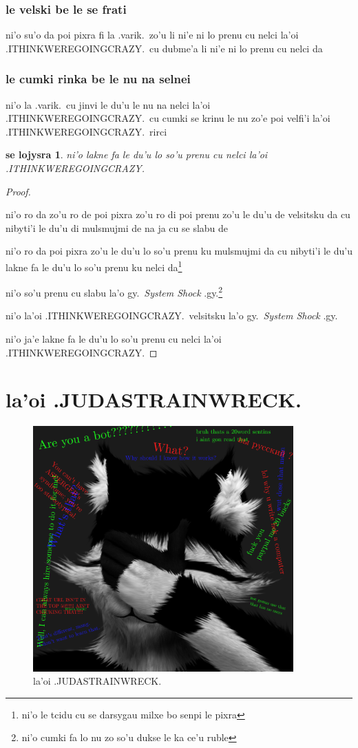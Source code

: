 \documentclass{report}
\newtheorem{thm}{se lojysra}
\begin{document}
\subsection{le velski be le se frati}
ni'o su'o da poi pixra fi la .varik.\ zo'u li ni'e ni lo prenu cu nelci la'oi .ITHINKWEREGOINGCRAZY.\ cu dubme'a li ni'e ni lo prenu cu nelci da

\subsection{le cumki rinka be le nu na selnei}
ni'o la .varik.\ cu jinvi le du'u le nu na nelci la'oi .ITHINKWEREGOINGCRAZY.\ cu cumki se krinu le nu zo'e poi velfi'i la'oi .ITHINKWEREGOINGCRAZY.\ rirci

\begin{thm}
ni'o lakne fa le du'u lo so'u prenu cu nelci la'oi .ITHINKWEREGOINGCRAZY.

\end{thm}

\begin{proof}
${}$

ni'o ro da zo'u ro de poi pixra zo'u ro di poi prenu zo'u le du'u de velsitsku da cu nibyti'i le du'u di mulsmujmi de na ja cu se slabu de

ni'o ro da poi pixra zo'u le du'u lo so'u prenu ku mulsmujmi da cu nibyti'i le du'u lakne fa le du'u lo so'u prenu ku nelci da\footnote{ni'o le tcidu cu se darsygau milxe bo senpi le pixra}

ni'o so'u prenu cu slabu la'o gy.\ \textit{System Shock} .gy.\footnote{ni'o cumki fa lo nu zo so'u dukse le ka ce'u ruble}

ni'o la'oi .ITHINKWEREGOINGCRAZY.\ velsitsku la'o gy.\ \textit{System Shock} .gy.

ni'o ja'e lakne fa le du'u lo so'u prenu cu nelci la'oi .ITHINKWEREGOINGCRAZY.
\end{proof}

\chapter{la'oi .JUDASTRAINWRECK.}
\begin{figure}[ht]
	\centering
	\includegraphics[width=10cm]{judastrainwreck/judastrainwreck.png}
	\caption[center]{la'oi .JUDASTRAINWRECK.}
\end{figure}
\end{document}
